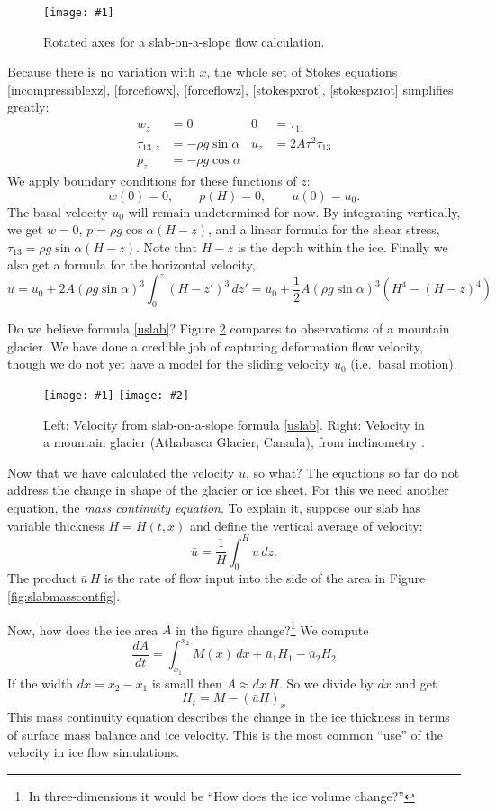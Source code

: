 \documentclass[titlepage,a4paper,final,12pt]{scrartcl}
\newcommand{\onefigsize}[3]{
\begin{figure}[ht]
\centering
\texttt{[image: \#1]}
\caption{#2}
\label{fig:#1}
\end{figure}}
\newcommand{\onefig}[2]{\onefigsize{#1}{#2}{3.0in}}
\newcommand{\twofigsizes}[5]{
\begin{figure}[ht]
\centering
\texttt{[image: \#1]} \quad
\texttt{[image: \#2]}
\caption{#3}
\label{fig:#1}
\end{figure}}
\begin{document}
\onefig{slab}{Rotated axes for a slab-on-a-slope flow calculation.}

Because there is no variation with $x$, the whole set of Stokes equations \eqref{incompressiblexz}, \eqref{forceflowx}, \eqref{forceflowz}, \eqref{stokespxrot}, \eqref{stokespzrot} simplifies greatly:
\begin{align*}
w_z &= 0 &   0 &= \tau_{11} \\
\tau_{13,z} &= - \rho g \sin\alpha &   u_z &= 2 A \tau^2 \tau_{13} \\
p_z &= - \rho g \cos\alpha
\end{align*}
We apply boundary conditions for these functions of $z$:
	$$w(0)=0, \qquad p(H)=0, \qquad u(0)=u_0.$$
The basal velocity $u_0$ will remain undetermined for now.  By integrating vertically, we get $w=0$, $p = \rho g \cos\alpha (H-z)$, and a linear formula for the shear stress, $\tau_{13} = \rho g \sin\alpha (H-z)$.  Note that $H-z$ is the depth within the ice.  Finally we also get a formula for the horizontal velocity,
\begin{equation}
u = u_0 + 2 A (\rho g \sin\alpha)^3 \int_0^z (H-z')^3\,dz' = u_0 + \frac{1}{2} A (\rho g \sin\alpha)^3  \left(H^4 - (H-z)^4\right) \label{uslab}
\end{equation}

Do we believe formula \eqref{uslab}?  Figure \ref{fig:slabvel} compares to observations of a mountain glacier.  We have done a credible job of capturing deformation flow velocity, though we do not yet have a model for the sliding velocity $u_0$ (i.e.~basal motion).  

\twofigsizes{slabvel}{athabasca_deform}{Left:  Velocity from slab-on-a-slope formula \eqref{uslab}.  Right:  Velocity in a mountain glacier (Athabasca Glacier, Canada), from inclinometry \cite{SavagePaterson}.}{2.2in}{2.0in}

Now that we have calculated the velocity $u$, so what?  The equations so far do not address the change in shape of the glacier or ice sheet.  For this we need another equation, the \emph{mass continuity equation}.  To explain it, suppose our slab has variable thickness $H=H(t,x)$ and define the vertical average of velocity:
	$$\bar u = \frac{1}{H}\int_0^{H} u\,dz.$$
The product $\bar u\, H$ is the rate of flow input into the side of the area in Figure \ref{fig:slabmasscontfig}.

Now, how does the ice area $A$ in the figure change?\footnote{In three-dimensions it would be ``How does the ice volume change?''}  We compute
	$$\frac{dA}{dt} = \int_{x_1}^{x_2} M(x)\,dx + \bar u_1 H_1 - \bar u_2 H_2$$
If the width $dx=x_2-x_1$ is small then $A\approx dx\, H$.  So we divide by $dx$ and get
\begin{equation}
H_t = M - \left(\bar u H\right)_x \label{masscont1D}
\end{equation}
This mass continuity equation describes the change in the ice thickness in terms of surface mass balance and ice velocity.  This is the most common ``use'' of the velocity in ice flow simulations.
\end{document}

